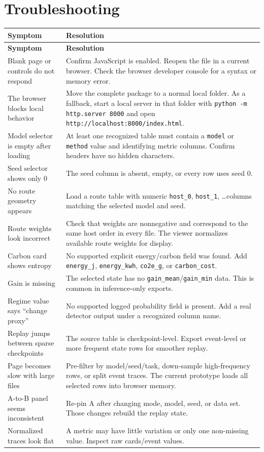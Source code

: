 \documentclass[11pt,a4paper]{article}
\newcommand{\code}[1]{\texttt{#1}}
\begin{document}
\section{Troubleshooting}

\begin{longtable}{@{}P{44mm}P{119mm}@{}}
\toprule
\textbf{Symptom} & \textbf{Resolution}\\
\midrule
\endfirsthead
\toprule
\textbf{Symptom} & \textbf{Resolution}\\
\midrule
\endhead
Blank page or controls do not respond & Confirm JavaScript is enabled. Reopen the file in a current browser. Check the browser developer console for a syntax or memory error.\\
The browser blocks local behavior & Move the complete package to a normal local folder. As a fallback, start a local server in that folder with \code{python -m http.server 8000} and open \code{http://localhost:8000/index.html}.\\
Model selector is empty after loading & At least one recognized table must contain a \code{model} or \code{method} value and identifying metric columns. Confirm headers have no hidden characters.\\
Seed selector shows only 0 & The seed column is absent, empty, or every row uses seed 0.\\
No route geometry appears & Load a route table with numeric \code{host\_0}, \code{host\_1}, \ldots columns matching the selected model and seed.\\
Route weights look incorrect & Check that weights are nonnegative and correspond to the same host order in every file. The viewer normalizes available route weights for display.\\
Carbon card shows entropy & No supported explicit energy/carbon field was found. Add \code{energy\_j}, \code{energy\_kwh}, \code{co2e\_g}, or \code{carbon\_cost}.\\
Gain is missing & The selected state has no \code{gain\_mean}/\code{gain\_min} data. This is common in inference-only exports.\\
Regime value says ``change proxy'' & No supported logged probability field is present. Add a real detector output under a recognized column name.\\
Replay jumps between sparse checkpoints & The source table is checkpoint-level. Export event-level or more frequent state rows for smoother replay.\\
Page becomes slow with large files & Pre-filter by model/seed/task, down-sample high-frequency rows, or split event traces. The current prototype loads all selected rows into browser memory.\\
A-to-B panel seems inconsistent & Re-pin A after changing mode, model, seed, or data set. Those changes rebuild the replay state.\\
Normalized traces look flat & A metric may have little variation or only one non-missing value. Inspect raw cards/event values.\\
\bottomrule
\end{longtable}
\end{document}
